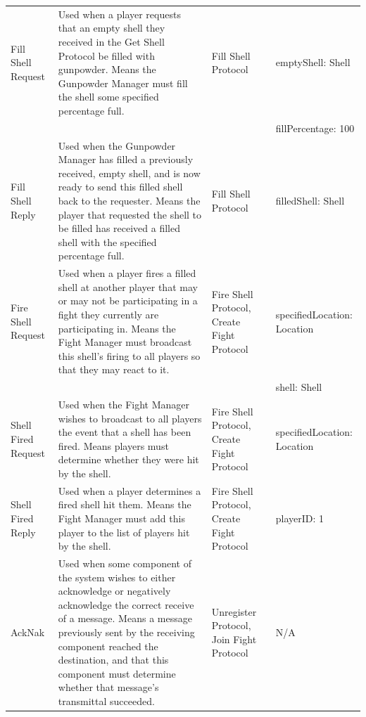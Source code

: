 \documentclass[12pt]{article}
\begin{document}
\begin{supertabular}{|p{2cm}|p{5cm}|p{3cm}|p{4cm}|}
				Fill Shell Request&Used when a player requests that an empty shell they received in the Get Shell Protocol be filled with gunpowder. Means the Gunpowder Manager must fill the shell some specified percentage full.&Fill Shell Protocol&emptyShell: Shell\\&&&fillPercentage: 100\\ \hline
				Fill Shell Reply&Used when the Gunpowder Manager has filled a previously received, empty shell, and is now ready to send this filled shell back to the requester. Means the player that requested the shell to be filled has received a filled shell with the specified percentage full.&Fill Shell Protocol&filledShell: Shell\\ \hline
				
					Fire Shell Request&Used when a player fires a filled shell at another player that may or may not be participating in a fight they currently are participating in. Means the Fight Manager must broadcast this shell's firing to all players so that they may react to it.&Fire Shell Protocol, Create Fight Protocol&specifiedLocation: Location\\&&&shell: Shell\\ \hline
					Shell Fired Request&Used when the Fight Manager wishes to broadcast to all players the event that a shell has been fired. Means players must determine whether they were hit by the shell.&Fire Shell Protocol, Create Fight Protocol&specifiedLocation: Location\\ \hline
					Shell Fired Reply&Used when a player determines a fired shell hit them. Means the Fight Manager must add this player to the list of players hit by the shell.&Fire Shell Protocol, Create Fight Protocol&playerID: 1\\ \hline
				
					AckNak&Used when some component of the system wishes to either acknowledge or negatively acknowledge the correct receive of a message. Means a message previously sent by the receiving component reached the destination, and that this component must determine whether that message's transmittal succeeded.&Unregister Protocol, Join Fight Protocol&N/A\\ \hline
					
			\end{supertabular}
		
\end{document}

